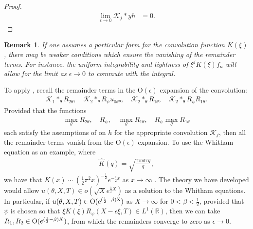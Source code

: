 \documentclass[11pt,leqno]{article}
\numberwithin{equation}{section}
\newcommand{\R}{\mathbb R}
\newtheorem{remark}[theorem]{Remark}
\theoremstyle{definition}
\begin{document}
\begin{appendices}
\begin{proof}
		\begin{align*}
			\lim_{\epsilon\rightarrow 0}\mathcal{K}_{j}*yh &= 0.
		\end{align*}
	\end{proof}
	\begin{remark}
		If one assumes a particular form for the convolution function $ K(\xi) $, there may be weaker conditions which ensure the vanishing of the remainder terms. For instance, the uniform integrability and tightness of $ \xi^{j}K(\xi)f_{n} $ will allow for the limit as $ \epsilon\rightarrow 0 $ to commute with the integral.
	\end{remark}
	To apply , recall the remainder terms in the O$ (\epsilon) $ expansion of the convolution:
	\begin{align*}
		\mathcal{K}_{1}*_{\theta}R_{2\theta},\quad\mathcal{K}_{2}*_{\theta}R_{\psi}u_{0\theta\theta},\quad \mathcal{K}_{2}*_{\theta}R_{1\theta},\quad \mathcal{K}_{2}*_{\theta}R_{\psi}R_{1\theta}.
	\end{align*}
	Provided that the functions
	\begin{align*}
		\max_{\theta}R_{2\theta},\quad R_{\psi},\quad \max_{\theta}R_{1\theta},\quad R_{\psi}\max_{\theta}R_{1\theta}
	\end{align*}
	each satisfy the assumptions of  on $ h $ for the appropriate convolution $ \mathcal{K}_{j} $, then all the remainder terms vanish from the O$ (\epsilon) $ expansion. To use the Whitham equation as an example, where
	\begin{align*}
		\widehat{K}(q) = \sqrt{\frac{\tanh q}{q}},
	\end{align*}
	we have that $ K(x) \sim \left(\frac{1}{2}\pi^{2}x\right)^{-\frac{1}{2}}e^{-\frac{1}{2}x} $ as $ x\rightarrow \infty $ \cite{Whitham1967,EW2019}. The theory we have developed would allow $ u(\theta,X,T) \in o(\sqrt{X}e^{\frac{1}{2}X}) $ as a solution to the Whitham equations. In particular, if $ u(\theta,X,T) \in \rm O(e^{(\frac{1}{2} - \beta)X}) $ as $ X \rightarrow \infty $ for $ 0 < \beta < \frac{1}{2} $, provided that $ \psi $ is chosen so that $ \xi K(\xi)R_{\psi}(X-\epsilon\xi,T) \in L^{1}(\R)$, then we can take $ R_{1},R_{2} \in {\rm O}(e^{(\frac{1}{2} - \beta)X}) $, from which the remainders converge to zero as $ \epsilon \rightarrow 0 $.
\end{appendices}



\end{document}
